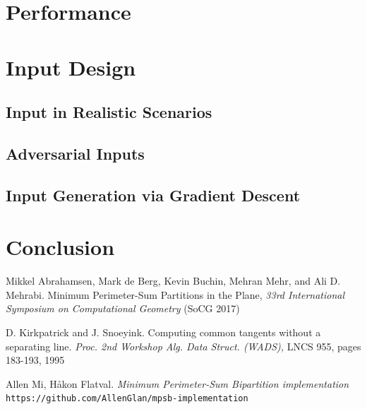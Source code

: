 \documentclass{article}
\begin{document}
\section{Performance}


\section{Input Design}

\subsection{Input in Realistic Scenarios}


\subsection{Adversarial Inputs}


\subsection{Input Generation via Gradient Descent}


\section{Conclusion}

\begin{thebibliography}{}
Mikkel Abrahamsen, Mark de Berg, Kevin Buchin, Mehran Mehr, and Ali D. Mehrabi. Minimum Perimeter-Sum Partitions in the Plane, \textit{33rd International Symposium on Computational Geometry} (SoCG 2017)

D. Kirkpatrick and J. Snoeyink. Computing common tangents without a separating line. \textit{Proc. 2nd Workshop Alg. Data Struct. (WADS),} LNCS 955, pages 183-193, 1995

Allen Mi, Håkon Flatval. \textit{Minimum Perimeter-Sum Bipartition implementation} \texttt{https://github.com/AllenGlan/mpsb-implementation}


\end{thebibliography}
\end{document}

